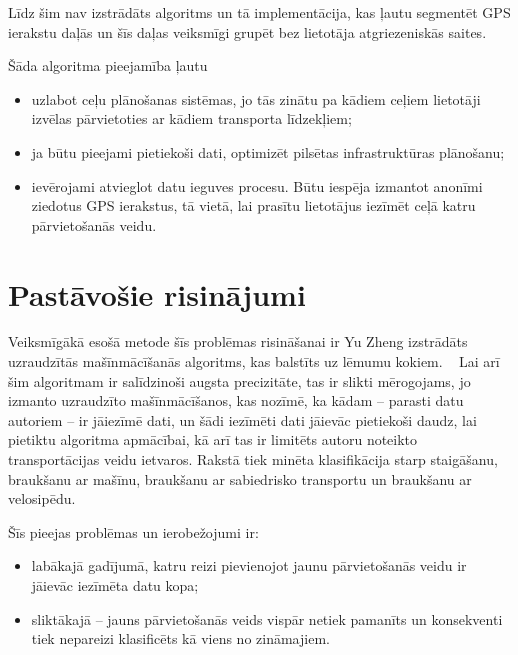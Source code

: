 \documentclass{ludis}
\begin{document}
Līdz šim nav izstrādāts algoritms un tā implementācija, kas ļautu seg\-mentēt GPS ierakstu daļās un 
šīs daļas veiksmīgi grupēt bez lietotāja atgrie\-zeniskās saites.

Šāda algoritma pieejamība ļautu 
\begin{itemize}
\item uzlabot ceļu plānošanas sistēmas, jo tās zinātu pa kādiem ceļiem lieto\-tāji izvēlas
  pārvietoties ar kādiem transporta līdzekļiem;
\item ja būtu pieejami pietiekoši dati, optimizēt pilsētas infrastruktūras \linebreak plānošanu;
\item ievērojami atvieglot datu ieguves procesu. Būtu iespēja izmantot ano\-nīmi ziedotus GPS 
  ierakstus, tā vietā, lai prasītu lietotājus iezīmēt ceļā katru pārvietošanās veidu.
\end{itemize}

\section{Pastāvošie risinājumi}
Veiksmīgākā esošā metode šīs problēmas risināšanai ir Yu Zheng izstrā\-dāts uzraudzītās mašīnmācīšanās
algoritms, kas balstīts uz lēmumu kokiem. ~\cite{zheng_gps_segmentation} Lai arī šim algoritmam
ir salīdzinoši augsta precizitāte, tas ir slikti mērog\-ojams, jo izmanto uzraudzīto mašīnmācīšanos,
kas nozīmē, ka kādam -- \linebreak parasti datu autoriem -- ir jāiezīmē dati, un šādi iezīmēti
dati jāievāc pietie\-koši daudz, lai pietiktu algoritma apmācībai, kā arī tas ir limitēts autoru 
noteikto transportācijas veidu ietvaros. Rakstā tiek minēta klasifikācija starp staigāšanu, 
braukšanu ar mašīnu, braukšanu ar sabiedrisko transportu un braukšanu ar velosipēdu. 

Šīs pieejas problēmas un ierobežojumi ir:
\begin{itemize}
\item labākajā gadījumā, katru reizi pievienojot jaunu pārvietošanās veidu ir jāievāc iezīmēta datu 
  kopa;
\item sliktākajā -- jauns pārvietošanās veids vispār netiek pamanīts un \linebreak 
  konsekventi tiek nepareizi klasificēts kā viens no zināmajiem.
\end{itemize}

\end{document}
